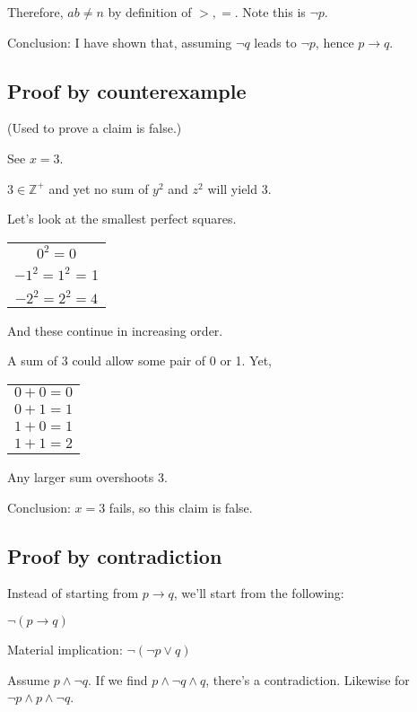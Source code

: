 \documentclass[english,openany]{book}
\begin{document}
	Therefore, $ab \neq n$ by definition of $>, =$. Note this is $\neg p$.

	Conclusion: I have shown that, assuming $\neg q$ leads to $\neg p$, hence $p \rightarrow q$. \newline

	\subsection{Proof by counterexample}

   (Used to prove a claim is false.)

	See $x=3$.

	$3 \in \mathbb Z^+$ and yet no sum of $y^2$ and $z^2$ will yield $3$.

	Let's look at the smallest perfect squares.

	\begin{tabular}{c}
		$0^2 = 0$\\
		$-1^2 = 1^2$ = 1\\
		$-2^2 = 2^2 = 4$\\
	\end{tabular}

	And these continue in increasing order.

	A sum of 3 could allow some pair of 0 or 1. Yet,

	\begin{tabular}{c}
		$0+0=0$\\
		$0+1=1$\\
		$1+0=1$\\
		$1+1=2$\\
	\end{tabular}

	Any larger sum overshoots 3.

	Conclusion: $x=3$ fails, so this claim is false.\newline


	\subsection{Proof by contradiction}

	Instead of starting from $p \rightarrow q$, we'll start from the following:

	$\neg (p \rightarrow q)$

	Material implication: $\neg(\neg p \lor q)$

	Assume $p \wedge \neg q$. If we find $p \wedge \neg q \wedge q$, there's a contradiction. Likewise for $\neg p \wedge p \wedge \neg q$.
\end{document}
